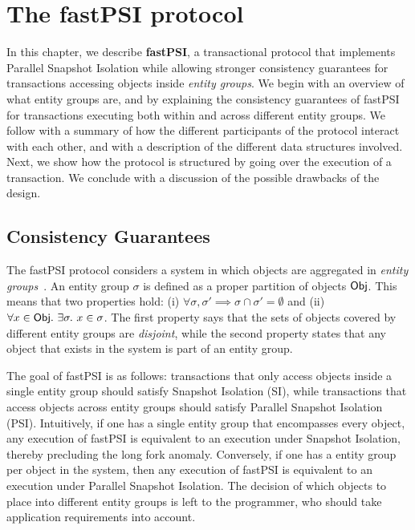 \cleardoublepage
\chapter{The fastPSI protocol}
\label{chapter:protocol}

In this chapter, we describe \textbf{fastPSI}, a transactional protocol that implements Parallel Snapshot Isolation while allowing stronger consistency guarantees for transactions accessing objects inside \emph{entity groups}. We begin with an overview of what entity groups are, and by explaining the consistency guarantees of fastPSI for transactions executing both within and across different entity groups. We follow with a summary of how the different participants of the protocol interact with each other, and with a description of the different data structures involved. Next, we show how the protocol is structured by going over the execution of a transaction. We conclude with a discussion of the possible drawbacks of the design.

\section{Consistency Guarantees}

The fastPSI protocol considers a system in which objects are aggregated in \emph{entity groups}~\citep{baker_megastore}. An entity group $\sigma$ is defined as a proper partition of objects ${\sf Obj}$. This means that two properties hold: (i) $\forall \sigma, \sigma' \implies \sigma \cap \sigma' = \emptyset$ and (ii) $\forall x \in {\sf Obj} .\ \exists \sigma .\ x \in \sigma$. The first property says that the sets of objects covered by different entity groups are \emph{disjoint}, while the second property states that any object that exists in the system is part of an entity group.

The goal of fastPSI is as follows: transactions that only access objects inside a single entity group should satisfy Snapshot Isolation (SI), while transactions that access objects across entity groups should satisfy Parallel Snapshot Isolation (PSI). Intuitively, if one has a single entity group that encompasses every object, any execution of fastPSI is equivalent to an execution under Snapshot Isolation, thereby precluding the long fork anomaly. Conversely, if one has a entity group per object in the system, then any execution of fastPSI is equivalent to an execution under Parallel Snapshot Isolation. The decision of which objects to place into different entity groups is left to the programmer, who should take application requirements into account.


